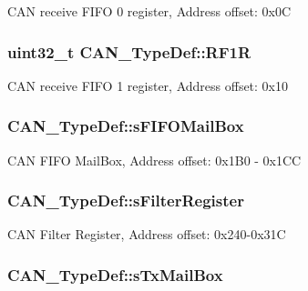 C\-A\-N receive F\-I\-F\-O 0 register, Address offset\-: 0x0\-C \hypertarget{struct_c_a_n___type_def_a69a528d1288c1de666df68655af1d20e}{
\subsubsection[{R\-F1\-R}]{ uint32\-\_\-t C\-A\-N\-\_\-\-Type\-Def\-::\-R\-F1\-R}}\label{struct_c_a_n___type_def_a69a528d1288c1de666df68655af1d20e}
C\-A\-N receive F\-I\-F\-O 1 register, Address offset\-: 0x10 \hypertarget{struct_c_a_n___type_def_a90ff90723c0ec4ae8a7028d4f3b024f4}{
\subsubsection[{s\-F\-I\-F\-O\-Mail\-Box}]{ C\-A\-N\-\_\-\-Type\-Def\-::s\-F\-I\-F\-O\-Mail\-Box}}\label{struct_c_a_n___type_def_a90ff90723c0ec4ae8a7028d4f3b024f4}
C\-A\-N F\-I\-F\-O Mail\-Box, Address offset\-: 0x1\-B0 -\/ 0x1\-C\-C \hypertarget{struct_c_a_n___type_def_aaf5116cf475c48e9f4db550100faa2d9}{
\subsubsection[{s\-Filter\-Register}]{ C\-A\-N\-\_\-\-Type\-Def\-::s\-Filter\-Register}}\label{struct_c_a_n___type_def_aaf5116cf475c48e9f4db550100faa2d9}
C\-A\-N Filter Register, Address offset\-: 0x240-\/0x31\-C \hypertarget{struct_c_a_n___type_def_ab78f764584ec276cd36960d4f4fcdc1a}{
\subsubsection[{s\-Tx\-Mail\-Box}]{ C\-A\-N\-\_\-\-Type\-Def\-::s\-Tx\-Mail\-Box}}\label{struct_c_a_n___type_def_ab78f764584ec276cd36960d4f4fcdc1a}
